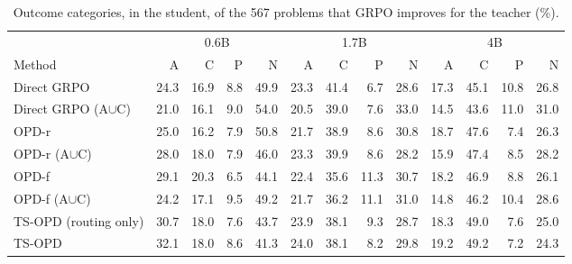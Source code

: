 \begin{table}[h]
\centering
\scriptsize
\setlength{\tabcolsep}{3pt}
\caption{Outcome categories, in the student, of the 567 problems that GRPO improves for the teacher (\%).}
\label{tab:app-rq3}
\begin{tabular}{lrrrrrrrrrrrr}
\toprule
 & \multicolumn{4}{c}{0.6B} & \multicolumn{4}{c}{1.7B} & \multicolumn{4}{c}{4B} \\
\cmidrule(lr){2-5}\cmidrule(lr){6-9}\cmidrule(lr){10-13}
Method & A & C & P & N & A & C & P & N & A & C & P & N \\
\midrule
Direct GRPO & 24.3 & 16.9 & 8.8 & 49.9 & 23.3 & 41.4 & 6.7 & 28.6 & 17.3 & 45.1 & 10.8 & 26.8 \\
Direct GRPO (A$\cup$C) & 21.0 & 16.1 & 9.0 & 54.0 & 20.5 & 39.0 & 7.6 & 33.0 & 14.5 & 43.6 & 11.0 & 31.0 \\
OPD-r & 25.0 & 16.2 & 7.9 & 50.8 & 21.7 & 38.9 & 8.6 & 30.8 & 18.7 & 47.6 & 7.4 & 26.3 \\
OPD-r (A$\cup$C) & 28.0 & 18.0 & 7.9 & 46.0 & 23.3 & 39.9 & 8.6 & 28.2 & 15.9 & 47.4 & 8.5 & 28.2 \\
OPD-f & 29.1 & 20.3 & 6.5 & 44.1 & 22.4 & 35.6 & 11.3 & 30.7 & 18.2 & 46.9 & 8.8 & 26.1 \\
OPD-f (A$\cup$C) & 24.2 & 17.1 & 9.5 & 49.2 & 21.7 & 36.2 & 11.1 & 31.0 & 14.8 & 46.2 & 10.4 & 28.6 \\
TS-OPD (routing only) & 30.7 & 18.0 & 7.6 & 43.7 & 23.9 & 38.1 & 9.3 & 28.7 & 18.3 & 49.0 & 7.6 & 25.0 \\
TS-OPD & 32.1 & 18.0 & 8.6 & 41.3 & 24.0 & 38.1 & 8.2 & 29.8 & 19.2 & 49.2 & 7.2 & 24.3 \\
\bottomrule
\end{tabular}
\end{table}
